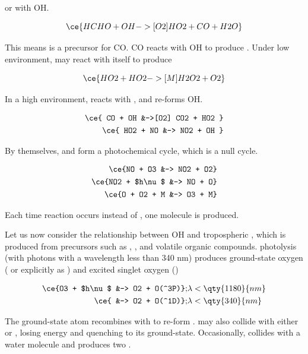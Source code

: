 or with OH.

\begin{equation}
    \ce{HCHO + OH ->[O2] HO2 + CO + H2O}
\end{equation}

This means  is a precursor for CO. CO reacts with OH to produce . Under low  environment,  may react with itself to produce 

\begin{equation}
    \ce{HO2 + HO2 ->[M] H2O2 + O2}
\end{equation}

In a high  environment,  reacts with , and re-forms OH. 

\begin{align}
    \ce{ CO + OH &->[O2] CO2 + HO2 } \\
    \ce{ HO2 + NO &-> NO2 + OH }
\end{align}

By themselves,  and  form a photochemical  cycle, which is a null cycle.

\begin{align}
    \ce{NO + O3 &-> NO2 + O2} \\
    \ce{NO2 + $h\nu$ &-> NO + O} \\
    \ce{O + O2 + M &-> O3 + M}
\end{align}

Each time  reaction occurs instead of , one  molecule is produced. 

Let us now consider the relationship between OH and tropospheric , which is produced from precursors such as , , and volatile organic compounds.  photolysis (with photons with a wavelength less than 340 nm) produces ground-state oxygen ( or explicitly as ) and excited singlet oxygen ()

\begin{align}
    \ce{O3 + $h\nu$ &-> O2 + O(^3P)}; &\lambda < \qty{1180}{nm} \\
    \ce{ &-> O2 + O(^1D)}; &\lambda < \qty{340}{nm}
\end{align}

The ground-state  atom recombines with  to re-form .  may also collide with either  or , losing energy and quenching to its ground-state. Occasionally,  collides with a water molecule and produces two .

